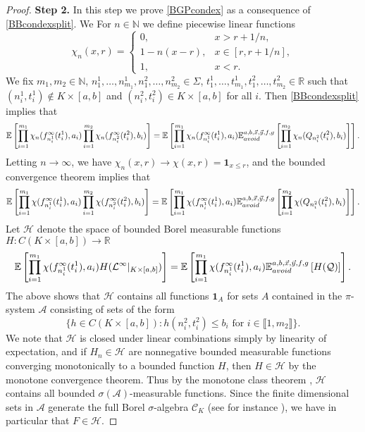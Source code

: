 \begin{proof}
	\noindent\textbf{Step 2. } In this step we prove \eqref{BGPcondex} as a consequence of \eqref{BBcondexsplit}. We For $n\in\mathbb{N}$ we define piecewise linear functions
	\[
	\chi_n(x,r) = \begin{cases}
	0, & x > r + 1/n,\\
	1-n(x-r), & x\in[r,r+1/n],\\
	1, & x < r.
	\end{cases}
	\]
	We fix $m_1,m_2\in\mathbb{N}$, $n^1_1,\dots,n^1_{m_1},n^2_1,\dots,n^2_{m_2}\in\Sigma$, $t^1_1,\dots,t^1_{m_1},t^2_1,\dots,t^2_{m_2}\in\mathbb{R}$ such that $(n^1_i,t^1_i)\notin K\times[a,b]$ and $(n^2_i,t^2_i)\in K\times[a,b]$ for all $i$. Then \eqref{BBcondexsplit} implies that
	\[
	\mathbb{E}\left[\prod_{i=1}^{m_1} \chi_n(f_{n_i^1}^\infty(t_i^1),a_i)\prod_{i=1}^{m_2}\chi_n(f_{n_i^2}^\infty(t_i^2),b_i)\right] = \mathbb{E}\left[\prod_{i=1}^{m_1} \chi_n(f_{n_i^1}^\infty(t_i^1),a_i)\mathbb{E}^{a,b,\vec{x},\vec{y},f,g}_{avoid}\left[\prod_{i=1}^{m_2} \chi_n(Q_{n_i^2}(t_i^2),b_i)\right]\right].
	\]
	Letting $n\to\infty$, we have $\chi_n(x,r)\to \chi(x,r)=\mathbf{1}_{x\leq r}$, and the bounded convergence theorem implies that
	\[
	\mathbb{E}\left[\prod_{i=1}^{m_1} \chi(f_{n_i^1}^\infty(t_i^1),a_i)\prod_{i=1}^{m_2}\chi(f_{n_i^2}^\infty(t_i^2),b_i)\right] = \mathbb{E}\left[\prod_{i=1}^{m_1} \chi(f_{n_i^1}^\infty(t_i^1),a_i)\mathbb{E}^{a,b,\vec{x},\vec{y},f,g}_{avoid}\left[\prod_{i=1}^{m_2} \chi(Q_{n_i^2}(t_i^2),b_i)\right]\right].
	\]
	Let $\mathcal{H}$ denote the space of bounded Borel measurable functions $H:C(K\times[a,b])\to\mathbb{R}$
	\begin{equation}\label{BGPH}
	\mathbb{E}\left[\prod_{i=1}^{m_1} \chi(f_{n_i^1}^\infty(t_i^1),a_i)H(\mathcal{L}^\infty|_{K\times[a,b]})\right] = \mathbb{E}\left[\prod_{i=1}^{m_1} \chi(f_{n_i^1}^\infty(t_i^1),a_i)\mathbb{E}^{a,b,\vec{x},\vec{y},f,g}_{avoid}\left[H(\mathcal{Q})\right]\right].
	\end{equation}
	The above shows that $\mathcal{H}$ contains all functions $\mathbf{1}_A$ for sets $A$ contained in the $\pi$-system $\mathcal{A}$ consisting of sets of the form
	\[
	\{h\in C(K\times[a,b]) : h(n_i^2,t_i^2) \leq b_i \mbox{ for } i\in\llbracket 1,m_2\rrbracket\}.
	\]
	We note that $\mathcal{H}$ is closed under linear combinations simply by linearity of expectation, and if $H_n\in\mathcal{H}$ are nonnegative bounded measurable functions converging monotonically to a bounded function $H$, then $H\in\mathcal{H}$ by the monotone convergence theorem. Thus by the monotone class theorem \cite[Theorem 5.2.2]{Durrett}, $\mathcal{H}$ contains all bounded $\sigma(\mathcal{A})$-measurable functions. Since the finite dimensional sets in $\mathcal{A}$ generate the full Borel $\sigma$-algebra $\mathcal{C}_K$ (see for instance \cite[Lemma 3.1]{DimMat}), we have in particular that $F\in\mathcal{H}$.
	

\end{proof}
